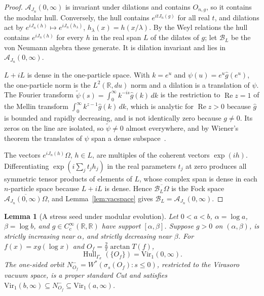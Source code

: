 \documentclass[12pt]{article}
\newtheorem{lemma}[theorem]{Lemma}
\theoremstyle{definition}
\theoremstyle{remark}
\newcommand{\Hull}{\operatorname{Hull}}
\newcommand{\Vir}{\mathrm{Vir}}
\begin{document}
\begin{proof}
\(\mathcal A_{J_n}(0,\infty)\) is invariant under dilations and contains \(O_{n,g}\), so
it contains the modular hull. Conversely, the hull contains \(e^{itJ_n(g)}\) for all
real \(t\), and dilations act by \(e^{iJ_n(h)}\mapsto e^{iJ_n(h_\lambda)}\),
\(h_\lambda(x)=h(x/\lambda)\). By the Weyl relations the hull contains
\(e^{iJ_n(h)}\) for every \(h\) in the real span \(L\) of the dilates of \(g\); let
\(\mathcal B_L\) be the von Neumann algebra these generate. It is dilation invariant and
lies in \(\mathcal A_{J_n}(0,\infty)\).

\(L+iL\) is dense in the one-particle space. With \(k=e^u\) and
\(\psi(u)=e^u\hat g(e^u)\), the one-particle norm is the \(L^2(\mathbb R,du)\) norm and a
dilation is a translation of \(\psi\). The Fourier transform
\(\tilde\psi(s)=\int_0^\infty k^{-is}\hat g(k)\,dk\) is the restriction to
\(\operatorname{Re}z=1\) of the Mellin transform \(\int_0^\infty k^{z-1}\hat g(k)\,dk\),
which is analytic for \(\operatorname{Re}z>0\) because \(\hat g\) is bounded and
rapidly decreasing, and is not identically zero because \(g\neq0\). Its zeros on the
line are isolated, so \(\tilde\psi\neq0\) almost everywhere, and by Wiener's theorem
the translates of \(\psi\) span a dense subspace~\cite{Wiener1932}.

The vectors \(e^{iJ_n(h)}\Omega\), \(h\in L\), are multiples of the coherent vectors
\(\exp(ih)\). Differentiating \(\exp(i\sum_jt_jh_j)\) in the real parameters \(t_j\) at
zero produces all symmetric tensor products of elements of \(L\), whose complex span is
dense in each \(n\)-particle space because \(L+iL\) is dense. Hence
\(\overline{\mathcal B_L\Omega}\) is the Fock space
\(\overline{\mathcal A_{J_n}(0,\infty)\Omega}\), and Lemma~\ref{lem:vacspace} gives
\(\mathcal B_L=\mathcal A_{J_n}(0,\infty)\).
\end{proof}

\begin{lemma}[A stress seed under modular evolution]\label{lem:stressmod}
Let \(0<a<b\), \(\alpha=\log a\), \(\beta=\log b\), and
\(g\in C_c^\infty(\mathbb R,\mathbb R)\) have support \([\alpha,\beta]\).
Suppose \(g>0\) on \((\alpha,\beta)\), is strictly increasing near \(\alpha\),
and strictly decreasing near \(\beta\). For
\(f(x)=xg(\log x)\) and \(O_f=\tfrac2\pi\arctan T(f)\),
\[
\Hull_{\Gamma_\sigma}(\{O_f\})=\Vir_1(0,\infty).
\]
The one-sided orbit \(N^-_{O_f}=W^*(\sigma_s(O_f):s\le0)\), restricted to
the Virasoro vacuum space, is a proper standard Cut and satisfies
\(\Vir_1(b,\infty)\subseteq N^-_{O_f}\subseteq\Vir_1(a,\infty)\).
\end{lemma}
\end{document}
